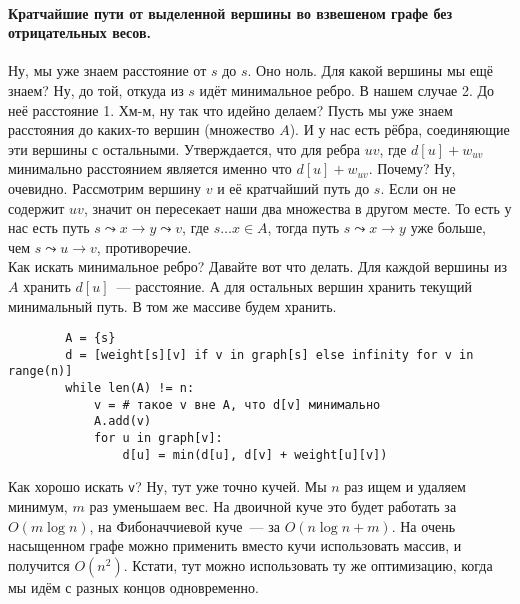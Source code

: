 \documentclass{article}
\begin{document}
    \paragraph{Кратчайшие пути от выделенной вершины во взвешеном графе без отрицательных весов.}
    \begin{figure}[H]
    \end{figure}\noindent
    Ну, мы уже знаем расстояние от $s$ до $s$. Оно ноль. Для какой вершины мы ещё знаем? Ну, до той, откуда из $s$ идёт минимальное ребро. В нашем случае 2. До неё расстояние 1. Хм-м, ну так что идейно делаем? Пусть мы уже знаем расстояния до каких-то вершин (множество $A$). И у нас есть рёбра, соединяющие эти вершины с остальными. Утверждается, что для ребра $uv$, где $d[u]+w_{uv}$ минимально расстоянием является именно что $d[u]+w_{uv}$. Почему? Ну, очевидно. Рассмотрим вершину $v$ и её кратчайший путь до $s$. Если он не содержит $uv$, значит он пересекает наши два множества в другом месте. То есть у нас есть путь $s\leadsto x\to y\leadsto v$, где $s\ldots x\in A$, тогда путь $s\leadsto x\to y$ уже больше, чем $s\leadsto u\to v$, противоречие.\\
    Как искать минимальное ребро? Давайте вот что делать. Для каждой вершины из $A$ хранить $d[u]$~--- расстояние. А для остальных вершин хранить текущий минимальный путь. В том же массиве будем хранить.
    \begin{verbatim}
        A = {s}
        d = [weight[s][v] if v in graph[s] else infinity for v in range(n)]
        while len(A) != n:
            v = # такое v вне A, что d[v] минимально
            A.add(v)
            for u in graph[v]:
                d[u] = min(d[u], d[v] + weight[u][v])
    \end{verbatim}
    Как хорошо искать \texttt{v}? Ну, тут уже точно кучей. Мы $n$ раз ищем и удаляем минимум, $m$ раз уменьшаем вес. На двоичной куче это будет работать за $O(m\log n)$, на Фибоначчиевой куче~--- за $O(n\log n+m)$. На очень насыщенном графе можно применить вместо кучи использовать массив, и получится $O(n^2)$. Кстати, тут можно использовать ту же оптимизацию, когда мы идём с разных концов одновременно.\\
\end{document}
